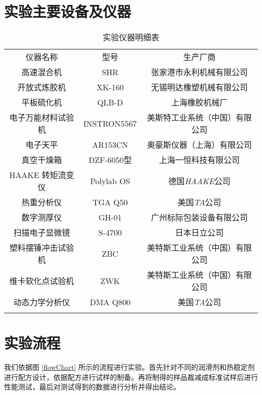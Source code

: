 \section{实验主要设备及仪器}

\begin{table}[H]
	\caption{实验仪器明细表}
	\label{tabEqu}
	\begin{center}
		\small{
		\begin{tabular}{ccc}
				\borderLine
				仪器名称 & 型号 & 生产厂商		\\
				\interLine
				高速混合机 & SHR & 张家港市永利机械有限公司	\\
				开放式炼胶机 & XK-160 & 无锡明达橡塑机械有限公司	\\
				平板硫化机 & QLB-D & 上海橡胶机械厂	\\
				电子万能材料试验机 & INSTRON5567 & 美斯特工业系统（中国）有限公司	\\
				电子天平 & AR153CN & 奥豪斯仪器（上海）有限公司	\\
				真空干燥箱 & DZF-6050型 & 上海一恒科技有限公司	\\
				HAAKE 转矩流变仪 & Polylab OS & 德国\textit{HAAKE}公司	\\
				热重分析仪 & TGA Q50 & 美国\textit{TA}公司	\\
				数字测厚仪 & GH-01 & 广州标际包装设备有限公司	\\
				扫描电子显微镜 & S-4700 & 日本日立公司	\\
				塑料摆锤冲击试验机 & ZBC & 美特斯工业系统（中国）有限公司	\\
				维卡软化点试验机 & ZWK & 美特斯工业系统（中国）有限公司	\\
				动态力学分析仪 & DMA Q800 & 美国\textit{TA}公司	\\
				\borderLine
		\end{tabular}
		}
	\end{center}
\end{table}

\section{实验流程}

我们依据图 \ref{flowChart} 所示的流程进行实验。首先针对不同的润滑剂和热稳定剂进行配方设计，依据配方进行试样的制备。再将制得的样品裁减成标准试样后进行性能测试，最后对测试得到的数据进行分析并得出结论。


